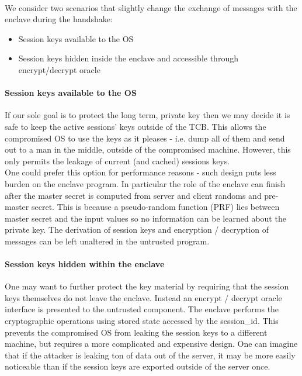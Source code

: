 \documentclass[../main.tex]{subfiles}
\begin{document}
\noindent
\\We consider two scenarios that slightly change the exchange of messages with the enclave during the handshake:
\begin{itemize}
	\item Session keys available to the OS
	\item Session keys hidden inside the enclave and accessible through
	encrypt/decrypt oracle
\end{itemize}



\paragraph{Session keys available to the OS}

If our sole goal is to protect the long term, private key then we may decide
it is safe to keep the active sessions' keys outside of the TCB. This allows
the compromised OS to use the keys as it pleases - i.e. dump all of them and
send out to a man in the middle, outside of the compromised machine. However,
this only permits the leakage of current (and cached) sessions keys.\\

\noindent
One could prefer this option for performance reasons - such design puts less
burden on the enclave program. In particular the role of the enclave can
finish after the master secret is computed from server and client randoms and
pre-master secret. This is because a pseudo-random function (PRF) lies between
master secret and the input values so no information can be learned about the
private key. The derivation of session keys and encryption / decryption of
messages can be left unaltered in the untrusted program.

\paragraph{Session keys hidden within the enclave}

One may want to further protect the key material by requiring that the session
keys themselves do not leave the enclave. Instead an encrypt / decrypt oracle
interface is presented to the untrusted component. The enclave performs the
cryptographic operations using stored state accessed by the session\_id. This
prevents the compromised OS from leaking the session keys to a different
machine, but requires a more complicated and expensive design.
One can imagine that if the attacker is leaking ton of data out of the server,
it may be more easily noticeable than if the session keys are exported outside of the server once.\\
\end{document}
